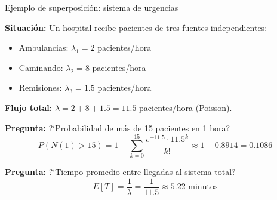 \documentclass[aspectratio=1610, 9pt]{beamer}
\begin{document}
\begin{frame}{Ejemplo de superposici\'{o}n: sistema de urgencias}

\textbf{Situaci\'{o}n:} Un hospital recibe pacientes de tres fuentes independientes:
\begin{itemize}
    \item Ambulancias: $\lambda_1 = 2$ pacientes/hora
    \item Caminando: $\lambda_2 = 8$ pacientes/hora
    \item Remisiones: $\lambda_3 = 1.5$ pacientes/hora
\end{itemize}

\vspace{0.3cm}
\textbf{Flujo total:} $\lambda = 2 + 8 + 1.5 = 11.5$ pacientes/hora (Poisson).

\vspace{0.3cm}
\textbf{Pregunta:} ?`Probabilidad de m\'{a}s de 15 pacientes en 1 hora?
\[
P(N(1) > 15) = 1 - \sum_{k=0}^{15} \frac{e^{-11.5}\cdot 11.5^k}{k!} \approx 1 - 0.8914 = 0.1086
\]

\textbf{Pregunta:} ?`Tiempo promedio entre llegadas al sistema total?
\[
E[T] = \frac{1}{\lambda} = \frac{1}{11.5} \approx 5.22 \text{ minutos}
\]
\end{frame}
\end{document}
